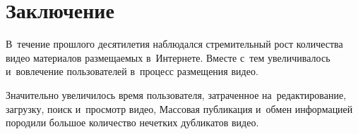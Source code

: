 

\section{Заключение}

В~течение прошлого десятилетия наблюдался стремительный рост
количества видео материалов размещаемых в~Интернете.
Вместе с~тем увеличивалось и~вовлечение пользователей
в~процесс размещения видео.

Значительно увеличилось время пользователя,
затраченное на~редактирование, загрузку, поиск и~просмотр видео,
Массовая публикация и~обмен информацией породили большое
количество нечетких дубликатов видео.



